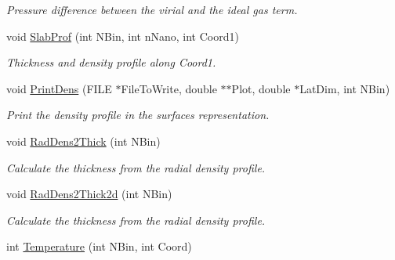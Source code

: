 \begin{DoxyCompactItemize}
\begin{DoxyCompactList}\small\item\em \-Pressure difference between the virial and the ideal gas term. \end{DoxyCompactList}\item 
void \hyperlink{classElPoly_a3db31f8490f0ea101281679a270e72fe}{\-Slab\-Prof} (int \-N\-Bin, int n\-Nano, int \-Coord1)
\begin{DoxyCompactList}\small\item\em \-Thickness and density profile along \-Coord1. \end{DoxyCompactList}\item 
void \hyperlink{classElPoly_a6591e29bd7876dc9dc255808d04499f9}{\-Print\-Dens} (\-F\-I\-L\-E $\ast$\-File\-To\-Write, double $\ast$$\ast$\-Plot, double $\ast$\-Lat\-Dim, int \-N\-Bin)
\begin{DoxyCompactList}\small\item\em \-Print the density profile in the surfaces representation. \end{DoxyCompactList}\item 
void \hyperlink{classElPoly_a7c40fb501bdadab09ee7cf8d99259299}{\-Rad\-Dens2\-Thick} (int \-N\-Bin)
\begin{DoxyCompactList}\small\item\em \-Calculate the thickness from the radial density profile. \end{DoxyCompactList}\item 
void \hyperlink{classElPoly_ad5ab39cdaa856caea3463819b436e7b9}{\-Rad\-Dens2\-Thick2d} (int \-N\-Bin)
\begin{DoxyCompactList}\small\item\em \-Calculate the thickness from the radial density profile. \end{DoxyCompactList}\item 
\hypertarget{classElPoly_ad0651bcc7574507f16c1998b57822bdd}{int \hyperlink{classElPoly_ad0651bcc7574507f16c1998b57822bdd}{\-Temperature} (int \-N\-Bin, int \-Coord)}\label{classElPoly_ad0651bcc7574507f16c1998b57822bdd}


\end{DoxyCompactItemize}
